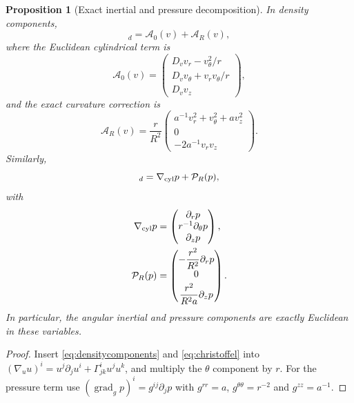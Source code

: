 \documentclass[aps,prd,reprint,superscriptaddress,nofootinbib,floatfix]{revtex4-2}
\newtheorem{proposition}[theorem]{Proposition}
\theoremstyle{definition}
\theoremstyle{remark}
\newcommand{\gradg}{\operatorname{grad}_g}
\newcommand{\cA}{\mathcal{A}}
\newcommand{\cP}{\mathcal{P}}
\begin{document}
\begin{proposition}[Exact inertial and pressure decomposition]\label{prop:advective}
	In density components,
	\begin{equation}
		[\nabla_u u]_d=\cA_0(v)+\cA_R(v),
		\label{eq:advsplit}
	\end{equation}
	where the Euclidean cylindrical term is
	\begin{equation}
		\cA_0(v)=
		\begin{pmatrix}
			D_vv_r-v_\theta^2/r       \\
			D_vv_\theta+v_rv_\theta/r \\
			D_vv_z
		\end{pmatrix},
		\label{eq:A0}
	\end{equation}
	and the exact curvature correction is
	\begin{equation}
		\cA_R(v)=\frac{r}{R^2}
		\begin{pmatrix}
			a^{-1}v_r^2+v_\theta^2+a v_z^2 \\
			0                              \\
			-2a^{-1}v_rv_z
		\end{pmatrix}.
		\label{eq:AR}
	\end{equation}
	Similarly,
	\begin{equation}
		[\gradg p]_d=\nabla_{\rm cyl}p+\cP_R(p),
		\label{eq:presssplit}
	\end{equation}
	with
	\begin{align}
		\nabla_{\rm cyl}p & =\begin{pmatrix}\partial_rp\\r^{-1}\partial_\theta p\\\partial_zp\end{pmatrix}, \\
		\cP_R(p)          & =\begin{pmatrix}
			                     -\dfrac{r^2}{R^2}\partial_rp \\[3pt]
			                     0                            \\[3pt]
			                     \dfrac{r^2}{R^2a}\partial_zp
		                     \end{pmatrix}.
		\label{eq:PR}
	\end{align}
	In particular, the angular inertial and pressure components are exactly Euclidean in these variables.
\end{proposition}

\begin{proof}
	Insert \cref{eq:densitycomponents} and \cref{eq:christoffel} into
	$(\nabla_u u)^i=u^j\partial_j u^i+\Gamma^i_{jk}u^ju^k$, and multiply the $\theta$ component by $r$. For the pressure term use $(\gradg p)^i=g^{ij}\partial_jp$ with $g^{rr}=a$, $g^{\theta\theta}=r^{-2}$ and $g^{zz}=a^{-1}$.
\end{proof}
\end{document}
